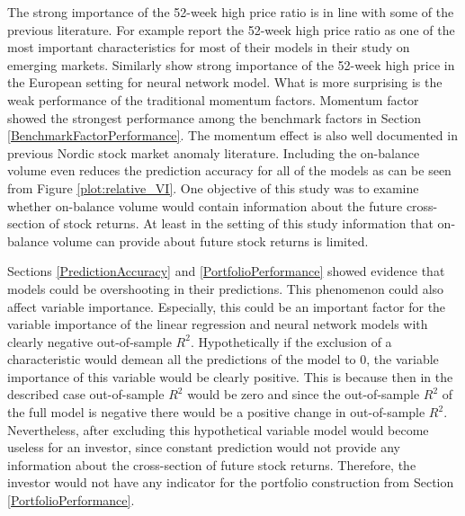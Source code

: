 \documentclass[12pt]{article}
\begin{document}
The strong importance of the 52-week high price ratio is in line with some of the previous literature. For example \citet{HANAUER2023} report the 52-week high price ratio as one of the most important characteristics for most of their models in their study on emerging markets. Similarly \citet{TOBEK2021100588} show strong importance of the 52-week high price in the European setting for neural network model.\footnotemark {} What is more surprising is the weak performance of the traditional momentum factors. Momentum factor showed the strongest performance among the benchmark factors in Section \ref{BenchmarkFactorPerformance}. The momentum effect is also well documented in previous Nordic stock market anomaly literature.\footnotemark {} Including the on-balance volume even reduces the prediction accuracy for all of the models as can be seen from Figure \ref{plot:relative_VI}. One objective of this study was to examine whether on-balance volume would contain information about the future cross-section of stock returns. At least in the setting of this study information that on-balance volume can provide about future stock returns is limited. \par

Sections \ref{PredictionAccuracy} and \ref{PortfolioPerformance} showed evidence that models could be overshooting in their predictions. This phenomenon could also affect variable importance. Especially, this could be an important factor for the variable importance of the linear regression and neural network models with clearly negative out-of-sample $R^2$. Hypothetically if the exclusion of a characteristic would demean all the predictions of the model to 0, the variable importance of this variable would be clearly positive. This is because then in the described case out-of-sample $R^2$ would be zero and since the out-of-sample $R^2$ of the full model is negative there would be a positive change in out-of-sample $R^2$. Nevertheless, after excluding this hypothetical variable model would become useless for an investor, since constant prediction would not provide any information about the cross-section of future stock returns. Therefore, the investor would not have any indicator for the portfolio construction from Section \ref{PortfolioPerformance}. \par
\end{document}
